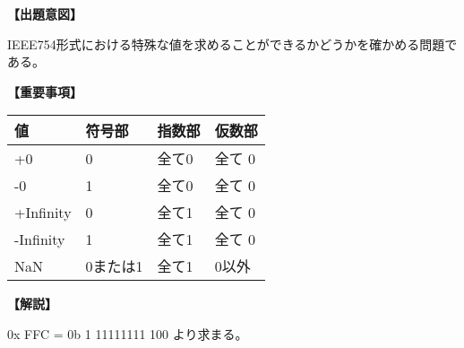 \noindent \textbf{【出題意図】}

\noindent IEEE754形式における特殊な値を求めることができるかどうかを確かめる問題である。

\vspace{1em}
\noindent \textbf{【重要事項】}

\begin{center}
\begin{tabularx}{0.9\fbwidth}{|X|X|X|X|}
\hline
値 & 符号部 & 指数部 & 仮数部 \\
\hline
+0 & 0 & 全て0 & 全て 0 \\
\hline
-0 & 1 & 全て0 & 全て 0 \\
\hline
+Infinity & 0 & 全て1 & 全て 0 \\
\hline
-Infinity & 1 & 全て1 & 全て 0 \\
\hline
NaN & 0または1 & 全て1 & 0以外 \\
\hline
\end{tabularx}
\end{center}


\vspace{1em}
\noindent \textbf{【解説】}

\noindent 0x FFC = 0b 1 11111111 100 より求まる。
